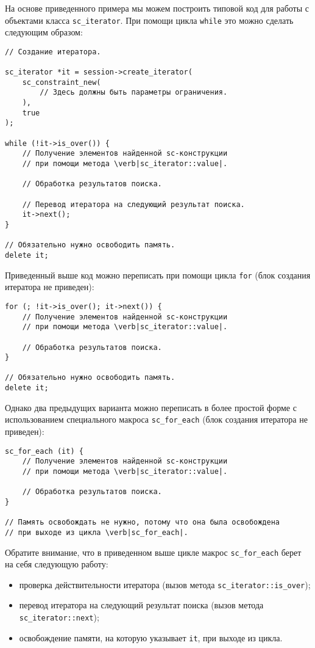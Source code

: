 На основе приведенного примера мы можем построить типовой код для
работы с объектами класса \lstinline|sc_iterator|. При помощи цикла
\lstinline|while| это можно сделать следующим образом:
\begin{lstlisting}[texcl]
// Создание итератора.

sc_iterator *it = session->create_iterator(
    sc_constraint_new(
        // Здесь должны быть параметры ограничения.
    ),
    true
);

while (!it->is_over()) {
    // Получение элементов найденной sc-конструкции
    // при помощи метода \verb|sc_iterator::value|.

    // Обработка результатов поиска.

    // Перевод итератора на следующий результат поиска.
    it->next();
}

// Обязательно нужно освободить память.
delete it;
\end{lstlisting}

Приведенный выше код можно переписать при помощи цикла \lstinline|for|
(блок создания итератора не приведен):
\begin{lstlisting}[texcl]
for (; !it->is_over(); it->next()) {
    // Получение элементов найденной sc-конструкции
    // при помощи метода \verb|sc_iterator::value|.

    // Обработка результатов поиска.
}

// Обязательно нужно освободить память.
delete it;
\end{lstlisting}

Однако два предыдущих варианта можно переписать в более простой форме
с использованием специального макроса \lstinline|sc_for_each| (блок
создания итератора не приведен):
\begin{lstlisting}[texcl]
sc_for_each (it) {
    // Получение элементов найденной sc-конструкции
    // при помощи метода \verb|sc_iterator::value|.

    // Обработка результатов поиска.
}

// Память освобождать не нужно, потому что она была освобождена
// при выходе из цикла \verb|sc_for_each|.
\end{lstlisting}

Обратите внимание, что в приведенном выше цикле макрос
\lstinline|sc_for_each| берет на себя следующую работу:
\begin{itemize}
\item проверка действительности итератора (вызов метода
  \lstinline|sc_iterator::is_over|);
\item перевод итератора на следующий результат поиска (вызов метода
  \lstinline|sc_iterator::next|);
\item освобождение памяти, на которую указывает \lstinline|it|, при
  выходе из цикла.
\end{itemize}


